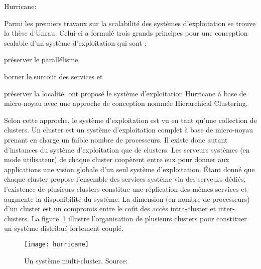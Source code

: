       \begin{paragraph}{Hurricane:}

        Parmi les premiers travaux sur la scalabilité des systèmes
        d’exploitation se trouve la thèse d’Unrau. Celui-ci a formulé trois
        grands principes pour une conception scalable d’un système
        d’exploitation qui sont : \benumline \item préserver le
        parallélisme \item borner le surcoût des services et \item préserver la
        localité\eenumline. \citet{unrau1995hierarchical} ont proposé le système
        d’exploitation Hurricane à base de micro-noyau avec une approche de
        conception nommée Hierarchical Clustering.

        Selon cette approche, le système d’exploitation est vu en tant qu’une
        collection de clusters. Un cluster est un système d’exploitation complet
        à base de micro-noyau prenant en charge un faible nombre de
        processeurs. Il existe donc autant d’instances du système d’exploitation
        que de clusters. Les serveurs systèmes (en mode utilisateur) de chaque
        cluster coopèrent entre eux pour donner aux applications une vision
        globale d’un seul système d’exploitation. Étant donné que chaque cluster
        propose l’ensemble des services système via des serveurs dédiés,
        l’existence de plusieurs clusters constitue une réplication des mêmes
        services et augmente la disponibilité du système. La dimension (en
        nombre de processeurs) d’un cluster est un compromis entre le coût des
        accès intra-cluster et inter-clusters. La figure~\ref{fig:hurricane}
        illustre l’organisation de plusieurs clusters pour constituer un système
        distribué fortement couplé.

        \begin{figure}[h]
          \centering \texttt{[image: hurricane]}
          \caption{Un système multi-cluster. Source:
            \citet{unrau1995hierarchical}}
          \label{fig:hurricane}
        \end{figure}



\end{paragraph}
